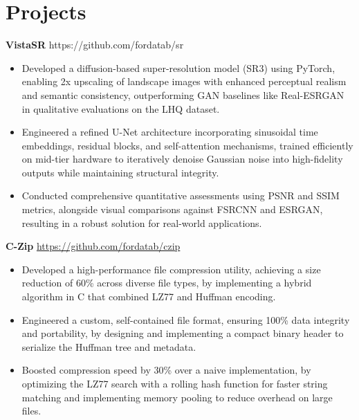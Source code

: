 \documentclass[11pt]{article}       %
\begin{document}
\vspace{-18.5pt}

\section*{Projects}


\textbf{VistaSR} \hfill {https://github.com/fordatab/sr} \
\vspace{-10pt}
\begin{itemize}
\item Developed a diffusion-based super-resolution model (SR3) using PyTorch, enabling 2x upscaling of landscape images with enhanced perceptual realism and semantic consistency, outperforming GAN baselines like Real-ESRGAN in qualitative evaluations on the LHQ dataset.
\item Engineered a refined U-Net architecture incorporating sinusoidal time embeddings, residual blocks, and self-attention mechanisms, trained efficiently on mid-tier hardware to iteratively denoise Gaussian noise into high-fidelity outputs while maintaining structural integrity.
\item Conducted comprehensive quantitative assessments using PSNR and SSIM metrics, alongside visual comparisons against FSRCNN and ESRGAN, resulting in a robust solution for real-world applications.
\end{itemize}

\textbf{C-Zip} \hfill \href{https://github.com/fordatab/czip}{https://github.com/fordatab/czip} \
\vspace{-10pt}
\begin{itemize}
\item Developed a high-performance file compression utility, achieving a size reduction of 60\% across diverse file types, by implementing a hybrid algorithm in C that combined LZ77 and Huffman encoding. 
\item Engineered a custom, self-contained file format, ensuring 100\% data integrity and portability, by designing and implementing a compact binary header to serialize the Huffman tree and metadata.
\item Boosted compression speed by 30\% over a naive implementation, by optimizing the LZ77 search with a rolling hash function for faster string matching and implementing memory pooling to reduce overhead on large files.
\end{itemize}
\end{document}
